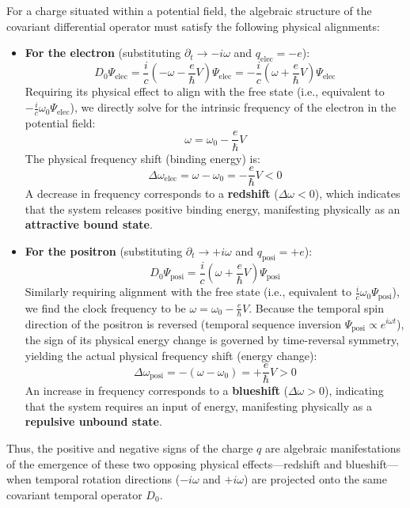 \documentclass[12pt, a4paper]{article}
\begin{document}
For a charge situated within a potential field, the algebraic structure of the covariant differential operator must satisfy the following physical alignments:
\begin{itemize}
    \item \textbf{For the electron} (substituting $\partial_t \to -i\omega$ and $q_{\mathrm{elec}} = -e$):
    \begin{equation}
    D_0 \Psi_{\mathrm{elec}} = \frac{i}{c} \left( -\omega - \frac{e}{\hbar} V \right) \Psi_{\mathrm{elec}} = -\frac{i}{c} \left( \omega + \frac{e}{\hbar} V \right) \Psi_{\mathrm{elec}}
    \end{equation}
    Requiring its physical effect to align with the free state (i.e., equivalent to $-\frac{i}{c}\omega_0 \Psi_{\mathrm{elec}}$), we directly solve for the intrinsic frequency of the electron in the potential field:
    \begin{equation}
    \omega = \omega_0 - \frac{e}{\hbar} V
    \end{equation}
    The physical frequency shift (binding energy) is:
    \begin{equation}
    \Delta\omega_{\mathrm{elec}} = \omega - \omega_0 = -\frac{e}{\hbar} V < 0
    \end{equation}
    A decrease in frequency corresponds to a \textbf{redshift} ($\Delta\omega < 0$), which indicates that the system releases positive binding energy, manifesting physically as an \textbf{attractive bound state}.
    
    \item \textbf{For the positron} (substituting $\partial_t \to +i\omega$ and $q_{\mathrm{posi}} = +e$):
    \begin{equation}
    D_0 \Psi_{\mathrm{posi}} = \frac{i}{c} \left( \omega + \frac{e}{\hbar} V \right) \Psi_{\mathrm{posi}}
    \end{equation}
    Similarly requiring alignment with the free state (i.e., equivalent to $\frac{i}{c}\omega_0 \Psi_{\mathrm{posi}}$), we find the clock frequency to be $\omega = \omega_0 - \frac{e}{\hbar}V$. Because the temporal spin direction of the positron is reversed (temporal sequence inversion $\Psi_{\mathrm{posi}} \propto e^{i\omega t}$), the sign of its physical energy change is governed by time-reversal symmetry, yielding the actual physical frequency shift (energy change):
    \begin{equation}
    \Delta\omega_{\mathrm{posi}} = -(\omega - \omega_0) = +\frac{e}{\hbar} V > 0
    \end{equation}
    An increase in frequency corresponds to a \textbf{blueshift} ($\Delta\omega > 0$), indicating that the system requires an input of energy, manifesting physically as a \textbf{repulsive unbound state}.
\end{itemize}
Thus, the positive and negative signs of the charge $q$ are algebraic manifestations of the emergence of these two opposing physical effects—redshift and blueshift—when temporal rotation directions ($-i\omega$ and $+i\omega$) are projected onto the same covariant temporal operator $D_0$.
\end{document}

